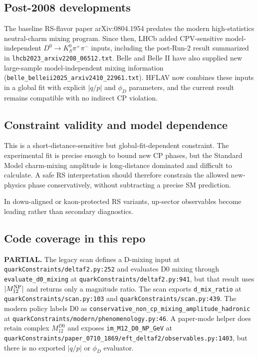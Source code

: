 \subsection*{Post-2008 developments}
The baseline RS-flavor paper arXiv:0804.1954 predates the modern high-statistics
neutral-charm mixing program.  Since then, LHCb added CPV-sensitive
model-independent \(D^0\to K_S^0\pi^+\pi^-\) inputs, including the
post-Run-2 result summarized in
\texttt{lhcb2023\_arxiv2208\_06512.txt}.  Belle and Belle II have also supplied
new large-sample model-independent mixing information
(\texttt{belle\_belleii2025\_arxiv2410\_22961.txt}).  HFLAV now combines these
inputs in a global fit with explicit \(|q/p|\) and \(\phi_D\) parameters, and
the current result remains compatible with no indirect CP violation.

\subsection*{Constraint validity and model dependence}
This is a short-distance-sensitive but global-fit-dependent constraint.  The
experimental fit is precise enough to bound new CP phases, but the Standard
Model charm-mixing amplitude is long-distance dominated and difficult to
calculate.  A safe RS interpretation should therefore constrain the allowed
new-physics phase conservatively, without subtracting a precise SM prediction.

In down-aligned or kaon-protected RS variants, up-sector observables become
leading rather than secondary diagnostics.

\subsection*{Code coverage in this repo}
\textbf{PARTIAL.}  The legacy scan defines a D-mixing input at
\texttt{quarkConstraints/deltaf2.py:252} and evaluates D0 mixing through
\texttt{evaluate\_d0\_mixing} at \texttt{quarkConstraints/deltaf2.py:941}, but
that result uses \(|M_{12}^{\rm NP}|\) and returns only a magnitude ratio.
The scan exports \texttt{d\_mix\_ratio} at \texttt{quarkConstraints/scan.py:103}
and \texttt{quarkConstraints/scan.py:439}.  The modern policy labels D0 as
\texttt{conservative\_non\_cp\_mixing\_amplitude\_hadronic} at
\texttt{quarkConstraints/modern/phenomenology.py:46}.  A paper-mode helper does
retain complex \(M_{12}^{D0}\) and exposes \texttt{im\_M12\_D0\_NP\_GeV} at
\texttt{quarkConstraints/paper\_0710\_1869/eft\_deltaf2/observables.py:1403},
but there is no exported \(|q/p|\) or \(\phi_D\) evaluator.

